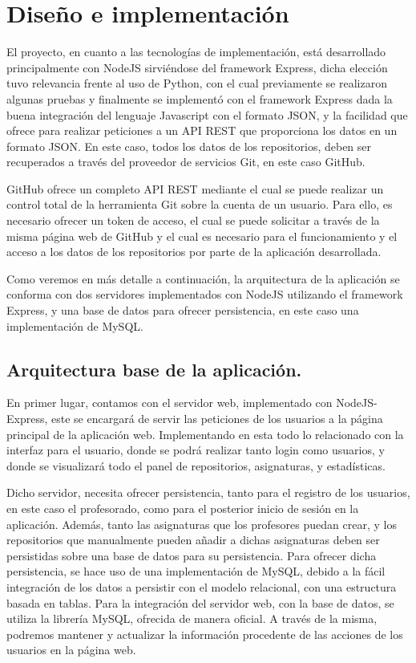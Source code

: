 \chapter{Diseño e implementación\label{05disenoTrabajo}}

El proyecto, en cuanto a las tecnologías de implementación, está desarrollado principalmente con NodeJS sirviéndose del framework Express, dicha elección tuvo relevancia frente al uso de Python, con el cual previamente se realizaron algunas pruebas\cite{PhytonGithub,GitHubWrappers} y finalmente se implementó con el framework Express dada la buena integración del lenguaje Javascript con el formato JSON, y la facilidad que ofrece para realizar peticiones a un API REST que proporciona los datos en un formato JSON. En este caso, todos los datos de los repositorios, deben ser recuperados a través del proveedor de servicios Git, en este caso GitHub.

GitHub ofrece un completo API REST mediante el cual se puede realizar un control total de la herramienta Git sobre la cuenta de un usuario. Para ello, es necesario ofrecer un token de acceso, el cual se puede solicitar a través de la misma página web de GitHub y el cual es necesario para el funcionamiento y el acceso a los datos de los repositorios por parte de la aplicación desarrollada.

Como veremos en más detalle a continuación, la arquitectura de la aplicación se conforma con dos servidores implementados con NodeJS utilizando el framework Express, y una base de datos para ofrecer persistencia, en este caso una implementación de MySQL.




\section{Arquitectura base de la aplicación.}
En primer lugar, contamos con el servidor web, implementado con NodeJS-Express, este se encargará de servir las peticiones de los usuarios a la página principal de la aplicación web. Implementando en esta todo lo relacionado con la interfaz para el usuario, donde se podrá realizar tanto login como usuarios, y donde se visualizará todo el panel de repositorios, asignaturas, y estadísticas.

Dicho servidor, necesita ofrecer persistencia, tanto para el registro de los usuarios, en este caso el profesorado,  como para el posterior inicio de sesión en la aplicación. Además, tanto las asignaturas que los profesores puedan crear, y los repositorios que manualmente pueden añadir a dichas asignaturas deben ser persistidas sobre una base de datos para su persistencia.
Para ofrecer dicha persistencia, se hace uso de una implementación de MySQL, debido a la fácil integración de los datos a persistir con el modelo relacional, con una estructura basada en tablas. Para la integración del servidor web, con la base de datos, se utiliza la librería MySQL, ofrecida de manera oficial. A través de la misma, podremos mantener y actualizar la información procedente de las acciones de los usuarios en la página web.

